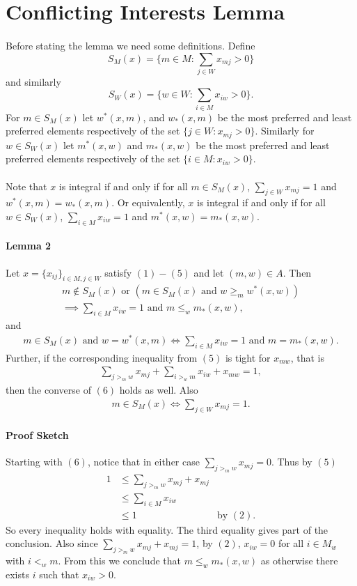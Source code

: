 \documentclass[letterpaper,12pt,oneside,onecolumn]{article}
\begin{document}
\section{Conflicting Interests Lemma}
\paragraph{}
Before stating the lemma we need some definitions. Define $$ S_M(x) = \{m\in M : \sum_{j\in W} x_{mj} > 0\}$$ and similarly $$S_W(x) = \{w\in W: \sum_{i \in M} x_{iw} > 0\}.$$ For $m \in S_M(x)$ let $w^*(x,m)$, and $w_*(x,m)$ be the most preferred and least preferred elements respectively of the set $\{ j \in W: x_{mj}>0\}$. Similarly for $w \in S_W(x)$ let $m^*(x,w)$ and $m_*(x,w)$ be the most preferred and least preferred elements respectively of the set $\{i \in M : x_{iw} > 0\}$.
\paragraph{}
Note that $x$ is integral if and only if for all $m \in S_M(x)$, $\sum_{j \in W} x_{mj}=1$ and $w^*(x,m) = w_*(x,m)$. Or equivalently, $x$ is integral if and only if for all $w \in S_W(x)$, $\sum_{i\in M} x_{iw} = 1$ and $m^*(x,w) = m_*(x,w)$.
\paragraph{Lemma 2}
Let $x = \{x_{ij}\}_{i\in M, j\in W}$ satisfy $(1) - (5)$ and let $(m,w) \in A$. Then 
\begin{align}
m\not\in S_M(x) \text{ or } (m\in S_M(x) \text{ and } w \geq_{m} w^*(x,w)) \nonumber\\\implies \sum_{i\in M} x_{iw} = 1 \text{ and } m \leq_w m_*(x,w),
\end{align}
and
\begin{align}
m\in S_M(x) \text{ and } w = w^*(x,m) \iff \sum_{i \in M} x_{iw} = 1 \text{ and } m = m_*(x,w).
\end{align}
Further, if the corresponding inequality from $(5)$ is tight for $x_{mw}$, that is 
\begin{align}
\sum_{j >_m w} x_{mj} + \sum_{i >_w m} x_{iw} + x_{mw} = 1,
\end{align}
then the converse of $(6)$ holds as well. Also 
\begin{align}
m \in S_M(x) \iff \sum_{j \in W} x_{mj} = 1.
\end{align}
\paragraph{Proof Sketch}
Starting with $(6)$, notice that in either case $\sum_{j >_m w} x_{mj} = 0$. Thus by $(5)$
\begin{align*}
1 &\leq \sum_{j >_m w} x_{mj} + x_{mj} \\
&\leq \sum_{i \in M} x_{iw} \\
&\leq 1 &\text{by $(2)$}.
\end{align*}
So every inequality holds with equality. The third equality gives part of the conclusion. Also since $\sum_{j >_m w} x_{mj} + x_{mj}=1$, by $(2)$, $x_{iw} = 0$ for all $i \in M_w$ with $i <_w m$. From this we conclude that $m \leq_w m_*(x,w)$ as otherwise there exists $i$ such that $x_{iw} > 0$.
\paragraph{}
\end{document}
